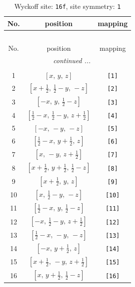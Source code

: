 \documentclass[fleqn,8pt]{jsarticle}
\begin{document}
\begin{longtable}{ccc}
\caption{Wyckoff site: {\tt 16f}, site symmetry: {\tt 1}}
 \\
 \hline \hline
No. & position & mapping \\ \hline \endfirsthead

\multicolumn{2}{l}{\tablename\ \thetable{}} \\
 \hline \hline
No. & position & mapping \\ \hline \endhead

 \hline \hline
\multicolumn{2}{r}{\footnotesize\it continued ...} \\ \endfoot

 \hline \hline
\multicolumn{2}{r}{} \\ \endlastfoot

1 & $\left[ x,\, y,\, z \right]$ & {\tt [1]} \\ \hline
2 & $\left[ x + \frac{1}{2},\, \frac{1}{2} - y,\, - z \right]$ & {\tt [2]} \\ \hline
3 & $\left[ - x,\, y,\, \frac{1}{2} - z \right]$ & {\tt [3]} \\ \hline
4 & $\left[ \frac{1}{2} - x,\, \frac{1}{2} - y,\, z + \frac{1}{2} \right]$ & {\tt [4]} \\ \hline
5 & $\left[ - x,\, - y,\, - z \right]$ & {\tt [5]} \\ \hline
6 & $\left[ \frac{1}{2} - x,\, y + \frac{1}{2},\, z \right]$ & {\tt [6]} \\ \hline
7 & $\left[ x,\, - y,\, z + \frac{1}{2} \right]$ & {\tt [7]} \\ \hline
8 & $\left[ x + \frac{1}{2},\, y + \frac{1}{2},\, \frac{1}{2} - z \right]$ & {\tt [8]} \\ \hline
9 & $\left[ x + \frac{1}{2},\, y,\, z \right]$ & {\tt [9]} \\ \hline
10 & $\left[ x,\, \frac{1}{2} - y,\, - z \right]$ & {\tt [10]} \\ \hline
11 & $\left[ \frac{1}{2} - x,\, y,\, \frac{1}{2} - z \right]$ & {\tt [11]} \\ \hline
12 & $\left[ - x,\, \frac{1}{2} - y,\, z + \frac{1}{2} \right]$ & {\tt [12]} \\ \hline
13 & $\left[ \frac{1}{2} - x,\, - y,\, - z \right]$ & {\tt [13]} \\ \hline
14 & $\left[ - x,\, y + \frac{1}{2},\, z \right]$ & {\tt [14]} \\ \hline
15 & $\left[ x + \frac{1}{2},\, - y,\, z + \frac{1}{2} \right]$ & {\tt [15]} \\ \hline
16 & $\left[ x,\, y + \frac{1}{2},\, \frac{1}{2} - z \right]$ & {\tt [16]} \\
\end{longtable}
\end{document}
